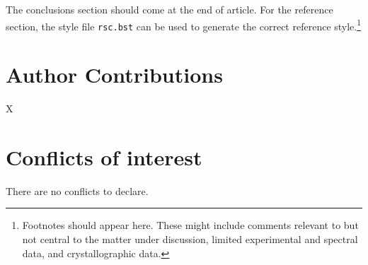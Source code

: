 \documentclass[twoside,twocolumn,9pt]{article}
\renewcommand{\refname}{Notes and references}
\begin{document}

\clearpage
The conclusions section should come at the end of article. For the reference section, the style file \texttt{rsc.bst} can be used to generate the correct reference style.\footnote[4]{Footnotes should appear here. These might include comments relevant to but not central to the matter under discussion, limited experimental and spectral data, and crystallographic data.}

\section*{Author Contributions}
X

\section*{Conflicts of interest}
There are no conflicts to declare.








\scriptsize{
 } %
\end{document}
